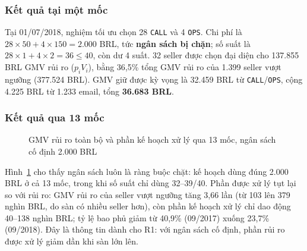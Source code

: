 \subsubsection*{Kết quả tại một mốc}
Tại 01/07/2018, nghiệm tối ưu chọn 28 \texttt{CALL} và 4 \texttt{OPS}. Chi phí là $28 \times 50 + 4 \times 150 = 2.000$ BRL, tức \textbf{ngân sách bị chặn}; số suất là $28 \times 1 + 4 \times 2 = 36 \le 40$, còn dư 4 suất. 32 seller được chọn đại diện cho 137.855 BRL GMV rủi ro ($p_i V_i$), bằng 36,5\% tổng GMV rủi ro của 1.399 seller vượt ngưỡng (377.524 BRL). GMV giữ được kỳ vọng là 32.459 BRL từ \texttt{CALL}/\texttt{OPS}, cộng 4.225 BRL từ 1.233 email, tổng \textbf{36.683 BRL}.

\subsubsection*{Kết quả qua 13 mốc}
\begin{figure}[htbp]
\centering
{}
\caption{GMV rủi ro toàn bộ và phần kế hoạch xử lý qua 13 mốc, ngân sách cố định 2.000 BRL}
\label{fig:risk_over_time}
\end{figure}

Hình~\ref{fig:risk_over_time} cho thấy ngân sách luôn là ràng buộc chặt: kế hoạch dùng đúng 2.000 BRL ở cả 13 mốc, trong khi số suất chỉ dùng 32--39/40. Phần được xử lý tụt lại so với rủi ro: GMV rủi ro của seller vượt ngưỡng tăng 3,66 lần (từ 103 lên 379 nghìn BRL, do sàn có nhiều seller hơn), còn phần kế hoạch xử lý chỉ dao động 40--138 nghìn BRL; tỷ lệ bao phủ giảm từ 40,9\% (09/2017) xuống 23,7\% (09/2018). Đây là thông tin dành cho R1: với ngân sách cố định, phần rủi ro được xử lý giảm dần khi sàn lớn lên.

